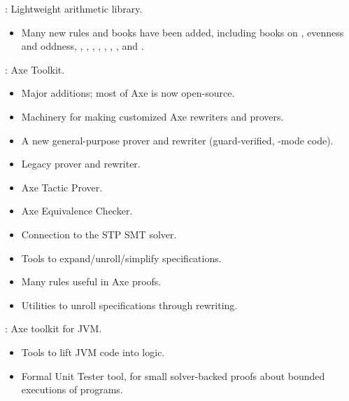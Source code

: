 
\begin{frame}

\implibtitle

:
Lightweight arithmetic library.
\begin{itemize}
\item Many new rules and books have been added, including books on
   , evenness and oddness,
  , , , , ,
  \code{<=}, , and .
\end{itemize}

\end{frame}


\begin{frame}

\implibtitle

:
Axe Toolkit.
\begin{itemize}
\item Major additions; most of Axe is now open-source.
\item Machinery for making customized Axe rewriters and provers.
\item A new general-purpose prover and rewriter
      (guard-verified, -mode code).
\item Legacy prover and rewriter.
\item Axe Tactic Prover.
\item Axe Equivalence Checker.
\item Connection to the STP SMT solver.
\item Tools to expand/unroll/simplify specifications.
\item Many rules useful in Axe proofs.
\item Utilities to unroll specifications through rewriting.
\end{itemize}

\end{frame}


\begin{frame}

\implibtitle

:
Axe toolkit for JVM.
\begin{itemize}
\item Tools to lift JVM code into logic.
\item Formal Unit Tester tool, for small solver-backed proofs about
bounded executions of programs.
\end{itemize}

\end{frame}

